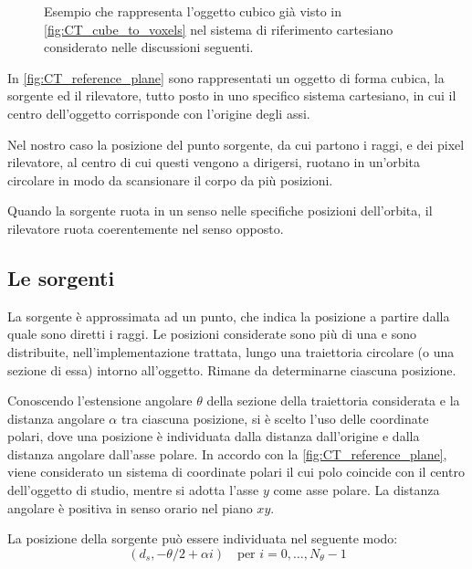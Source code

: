 \documentclass[12pt,a4paper]{report}
\begin{document}
\begin{figure}[H]
{
  }
  \caption{\label{fig:CT_reference_plane} Esempio che rappresenta l'oggetto cubico già visto in \autoref{fig:CT_cube_to_voxels}
           nel sistema di riferimento cartesiano considerato nelle discussioni seguenti.}
\end{figure}

In \autoref{fig:CT_reference_plane} sono rappresentati un oggetto di forma cubica, la sorgente ed il rilevatore, tutto posto
in uno specifico sistema cartesiano, in cui il centro dell'oggetto corrisponde con l'origine degli assi.

Nel nostro caso la posizione del punto sorgente, da cui partono i raggi, e dei pixel rilevatore, al centro di cui questi vengono
a dirigersi, ruotano in un'orbita circolare in modo da scansionare il corpo da più posizioni.

Quando la sorgente ruota in un senso nelle specifiche posizioni dell'orbita, il rilevatore ruota coerentemente nel senso opposto.

\subsection{Le sorgenti}

La sorgente è approssimata ad un punto, che indica la posizione a partire dalla quale sono diretti i raggi.
Le posizioni considerate sono più di una e sono distribuite, nell'implementazione trattata, lungo una traiettoria circolare
(o una sezione di essa) intorno all'oggetto.
Rimane da determinarne ciascuna posizione.

Conoscendo l'estensione angolare \(\theta\) della sezione della traiettoria considerata e la distanza angolare \(\alpha\) tra
ciascuna posizione, si è scelto l'uso delle coordinate polari, dove una posizione è individuata dalla distanza dall'origine e
dalla distanza angolare dall'asse polare.
In accordo con la \autoref{fig:CT_reference_plane}, viene considerato un sistema di coordinate polari il cui polo coincide con
il centro dell'oggetto di studio, mentre si adotta l'asse \(y\) come asse polare.
La distanza angolare è positiva in senso orario nel piano \(xy\).

La posizione della sorgente può essere individuata nel seguente modo:
\begin{equation} \label{eq:goniometric_source_polar}
  (d_s,-\theta/2 + \alpha i) \quad \text{per } i = 0, \dots, N_\theta - 1
\end{equation}
\end{document}
